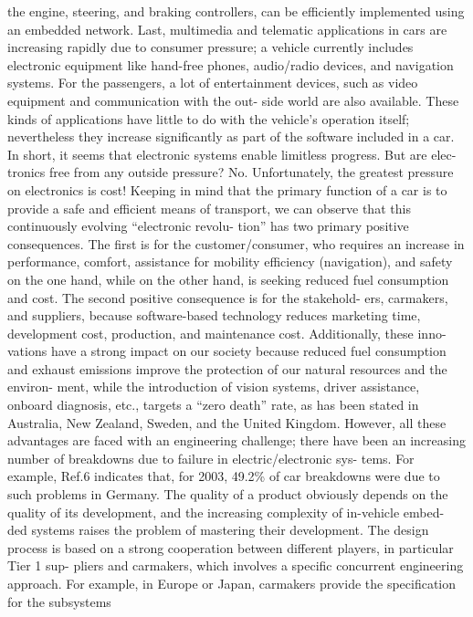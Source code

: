 the engine, steering, and braking controllers, can be efficiently implemented using an
embedded network.
Last, multimedia and telematic applications in cars are increasing rapidly due to
consumer pressure; a vehicle currently includes electronic equipment like hand-free
phones, audio/radio devices, and navigation systems. For the passengers, a lot of
entertainment devices, such as video equipment and communication with the out-
side world are also available. These kinds of applications have little to do with the
vehicle’s operation itself; nevertheless they increase significantly as part of the software
included in a car.
In short, it seems that electronic systems enable limitless progress. But are elec-
tronics free from any outside pressure? No. Unfortunately, the greatest pressure on
electronics is cost!
Keeping in mind that the primary function of a car is to provide a safe and efficient
means of transport, we can observe that this continuously evolving “electronic revolu-
tion” has two primary positive consequences. The first is for the customer/consumer,
who requires an increase in performance, comfort, assistance for mobility efficiency
(navigation), and safety on the one hand, while on the other hand, is seeking reduced
fuel consumption and cost. The second positive consequence is for the stakehold-
ers, carmakers, and suppliers, because software-based technology reduces marketing
time, development cost, production, and maintenance cost. Additionally, these inno-
vations have a strong impact on our society because reduced fuel consumption and
exhaust emissions improve the protection of our natural resources and the environ-
ment, while the introduction of vision systems, driver assistance, onboard diagnosis,
etc., targets a “zero death” rate, as has been stated in Australia, New Zealand, Sweden,
and the United Kingdom.
However, all these advantages are faced with an engineering challenge; there have
been an increasing number of breakdowns due to failure in electric/electronic sys-
tems. For example, Ref.6 indicates that, for 2003, 49.2\% of car breakdowns were
due to such problems in Germany. The quality of a product obviously depends on
the quality of its development, and the increasing complexity of in-vehicle embed-
ded systems raises the problem of mastering their development. The design process
is based on a strong cooperation between different players, in particular Tier 1 sup-
pliers and carmakers, which involves a specific concurrent engineering approach. For
example, in Europe or Japan, carmakers provide the specification for the subsystems
